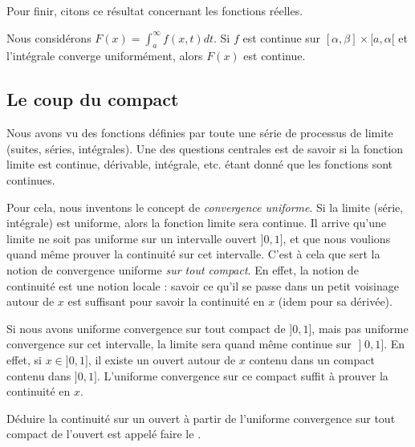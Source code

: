 Pour finir, citons ce résultat concernant les fonctions réelles.
\begin{theorem}     \label{ThoInDerrtCvUnifFContinue}
	Nous considérons \( F(x)=\int_a^{\infty}f(x,t)dt\). Si \( f\) est continue sur \( [\alpha,\beta]\times[a,\alpha[\) et l'intégrale converge uniformément, alors \( F(x)\) est continue.
\end{theorem}

\subsection{Le coup du compact}

\begin{normaltext}      \label{NORMooZWECooHvRgBw}

	Nous avons vu des fonctions définies par toute une série de processus de limite (suites, séries, intégrales). Une des questions centrales est de savoir si la fonction limite est continue, dérivable, intégrale, etc. étant donné que les fonctions sont continues.

	Pour cela, nous inventons le concept de \emph{convergence uniforme}. Si la limite (série, intégrale) est uniforme, alors la fonction limite sera continue. Il arrive qu'une limite ne soit pas uniforme sur un intervalle ouvert \( ]0,1]\), et que nous voulions quand même prouver la continuité sur cet intervalle. C'est à cela que sert la notion de convergence uniforme \emph{sur tout compact}. En effet, la notion de continuité est une notion locale : savoir ce qu'il se passe dans un petit voisinage autour de \( x\) est suffisant pour savoir la continuité en \( x\) (idem pour sa dérivée).

	Si nous avons uniforme convergence sur tout compact de \( ]0,1]\), mais pas uniforme convergence sur cet intervalle, la limite sera quand même continue sur \( \mathopen] 0 , 1 \mathclose]\). En effet, si \( x\in]0,1]\), il existe un ouvert autour de \( x\) contenu dans un compact contenu dans \( ]0,1]\). L'uniforme convergence sur ce compact suffit à prouver la continuité en \( x\).

	Déduire la continuité sur un ouvert à partir de l'uniforme convergence sur tout compact de l'ouvert est appelé faire le .
\end{normaltext}

